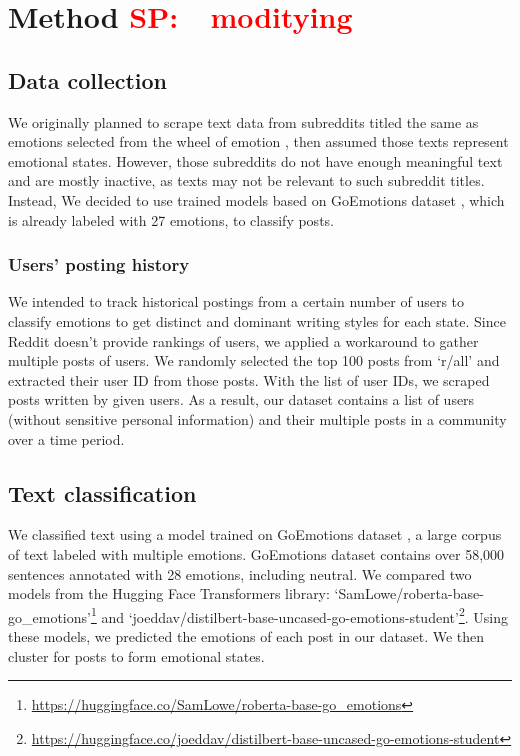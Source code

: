 \documentclass[conference,compsoc]{IEEEtran}
\newcommand{\seo}[1]{\textcolor{red}{SP:~~#1}}
\begin{document}
\section{Method \seo{moditying}}
\subsection{Data collection}
We originally planned to scrape text data from subreddits titled the same as emotions selected from the wheel of emotion \citep{Plutchik+Kellerman-13:emotion}, then assumed those texts represent emotional states. However, those subreddits do not have enough meaningful text and are mostly inactive, as texts may not be relevant to such subreddit titles. Instead, We decided to use trained models based on GoEmotions dataset \citep{Demszky+20:GoEmotions}, which is already labeled with 27 emotions, to classify posts.

\subsubsection{Users' posting history}
We intended to track historical postings from a certain number of users to classify emotions to get distinct and dominant writing styles for each state. Since Reddit doesn't provide rankings of users, we applied a workaround to gather multiple posts of users. We randomly selected the top 100 posts from `r/all' and extracted their user ID from those posts. With the list of user IDs, we scraped posts written by given users. As a result, our dataset contains a list of users (without sensitive personal information) and their multiple posts in a community over a time period.

\subsection{Text classification}
We classified text using a model trained on GoEmotions dataset \citep{Demszky+20:GoEmotions}, a large corpus of text labeled with multiple emotions. GoEmotions dataset contains over 58,000 sentences annotated with 28 emotions, including neutral. We compared two models from the Hugging Face Transformers library: `SamLowe/roberta-base-go\_emotions'\footnote{\url{https://huggingface.co/SamLowe/roberta-base-go_emotions}} and `joeddav/distilbert-base-uncased-go-emotions-student'\footnote{\url{https://huggingface.co/joeddav/distilbert-base-uncased-go-emotions-student}}. Using these models, we predicted the emotions of each post in our dataset. We then cluster for posts to form emotional states. 
\end{document}
